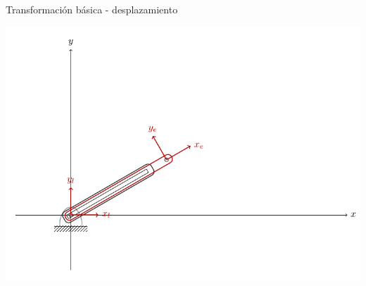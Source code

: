 \documentclass[presentation,aspectratio=169]{beamer}
\begin{document}
\begin{frame}[label={sec:org6fb97ba}]{Transformación básica - desplazamiento}
\begin{center}
 \includegraphics[height=0.8\textheight]{../figures/2d-prismatic-default-pos.pdf}
\end{center}
\end{frame}
\end{document}

